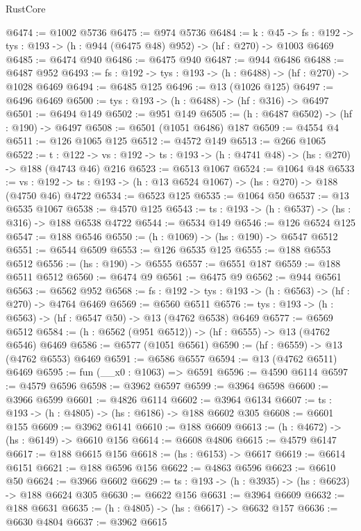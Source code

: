 \begin{lexlean}{RustCore}
\begin{coremodule}
@6474 := @1002 @5736
@6475 := @974 @5736
@6484 := {k : @45} ->
  {fs : @192} -> {tys : @193} -> (h : @944 (@6475 @48) @952) -> (hf : @270) -> @1003 @6469
@6485 := @6474 @940
@6486 := @6475 @940
@6487 := @944 @6486
@6488 := @6487 @952
@6493 := {fs : @192} -> {tys : @193} -> (h : @6488) -> (hf : @270) -> @1028 @6469
@6494 := @6485 @125
@6496 := @13 (@1026 @125)
@6497 := @6496 @6469
@6500 := {tys : @193} -> (h : @6488) -> (hf : @316) -> @6497
@6501 := @6494 @149
@6502 := @951 @149
@6505 := (h : @6487 @6502) -> (hf : @190) -> @6497
@6508 := @6501 (@1051 @6486) @187
@6509 := @4554 @4
@6511 := @126 @1065 @125
@6512 := @4572 @149
@6513 := @266 @1065
@6522 := {t : @122} ->
  {vs : @192} -> {ts : @193} -> (h : @4741 @48) -> (hs : @270) -> @188 (@4743 @46) @216
@6523 := @6513 @1067
@6524 := @1064 @48
@6533 := {vs : @192} ->
  {ts : @193} -> (h : @13 @6524 @1067) -> (hs : @270) -> @188 (@4750 @46) @4722
@6534 := @6523 @125
@6535 := @1064 @50
@6537 := @13 @6535 @1067
@6538 := @4570 @125
@6543 := {ts : @193} -> (h : @6537) -> (hs : @316) -> @188 @6538 @4722
@6544 := @6534 @149
@6546 := @126 @6524 @125
@6547 := @188 @6546
@6550 := (h : @1069) -> (hs : @190) -> @6547 @6512
@6551 := @6544 @6509
@6553 := @126 @6535 @125
@6555 := @188 @6553 @6512
@6556 := (hs : @190) -> @6555
@6557 := @6551 @187
@6559 := @188 @6511 @6512
@6560 := @6474 @9
@6561 := @6475 @9
@6562 := @944 @6561
@6563 := @6562 @952
@6568 := {fs : @192} -> {tys : @193} -> (h : @6563) -> (hf : @270) -> @4764 @6469
@6569 := @6560 @6511
@6576 := {tys : @193} -> (h : @6563) -> (hf : @6547 @50) -> @13 (@4762 @6538) @6469
@6577 := @6569 @6512
@6584 := (h : @6562 (@951 @6512)) -> (hf : @6555) -> @13 (@4762 @6546) @6469
@6586 := @6577 (@1051 @6561)
@6590 := (hf : @6559) -> @13 (@4762 @6553) @6469
@6591 := @6586 @6557
@6594 := @13 (@4762 @6511) @6469
@6595 := fun (__x0 : @1063) => @6591
@6596 := @4590 @6114
@6597 := @4579 @6596
@6598 := @3962 @6597
@6599 := @3964 @6598
@6600 := @3966 @6599
@6601 := @4826 @6114
@6602 := @3964 @6134
@6607 := {ts : @193} -> (h : @4805) -> (hs : @6186) -> @188 @6602 @305
@6608 := @6601 @155
@6609 := @3962 @6141
@6610 := @188 @6609
@6613 := (h : @4672) -> (hs : @6149) -> @6610 @156
@6614 := @6608 @4806
@6615 := @4579 @6147
@6617 := @188 @6615 @156
@6618 := (hs : @6153) -> @6617
@6619 := @6614 @6151
@6621 := @188 @6596 @156
@6622 := @4863 @6596
@6623 := @6610 @50
@6624 := @3966 @6602
@6629 := {ts : @193} -> (h : @3935) -> (hs : @6623) -> @188 @6624 @305
@6630 := @6622 @156
@6631 := @3964 @6609
@6632 := @188 @6631
@6635 := (h : @4805) -> (hs : @6617) -> @6632 @157
@6636 := @6630 @4804
@6637 := @3962 @6615

\end{coremodule}
\end{lexlean}
